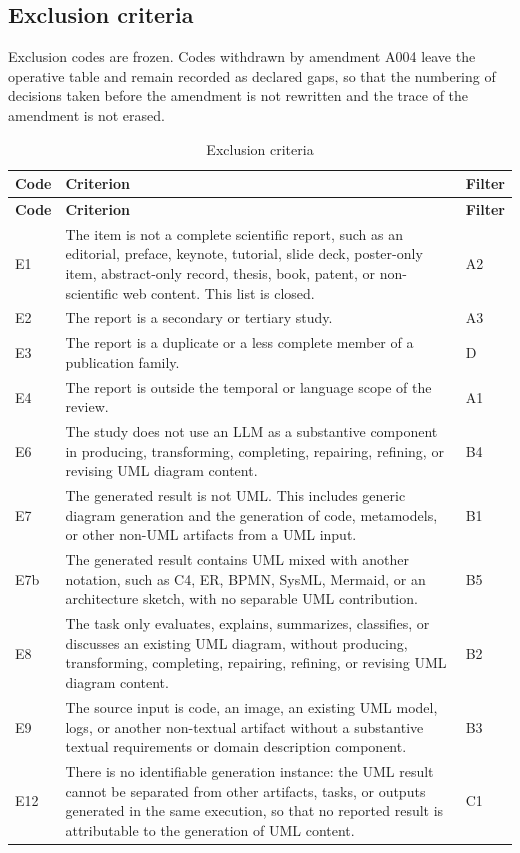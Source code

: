 \subsection{Exclusion criteria}

Exclusion codes are frozen. Codes withdrawn by amendment A004 leave the operative table and remain recorded as declared gaps, so that the numbering of decisions taken before the amendment is not rewritten and the trace of the amendment is not erased.

\begin{longtable}{p{} p{} p{}}
\caption{Exclusion criteria}
\label{tab:protocol_exclusion}\\
\toprule
\textbf{Code} & \textbf{Criterion} & \textbf{Filter} \\
\midrule
\endfirsthead
\toprule
\textbf{Code} & \textbf{Criterion} & \textbf{Filter} \\
\midrule
\endhead
E1 & The item is not a complete scientific report, such as an editorial, preface, keynote, tutorial, slide deck, poster-only item, abstract-only record, thesis, book, patent, or non-scientific web content. This list is closed. & A2 \\
E2 & The report is a secondary or tertiary study. & A3 \\
E3 & The report is a duplicate or a less complete member of a publication family. & D \\
E4 & The report is outside the temporal or language scope of the review. & A1 \\
E6 & The study does not use an LLM as a substantive component in producing, transforming, completing, repairing, refining, or revising UML diagram content. & B4 \\
E7 & The generated result is not UML. This includes generic diagram generation and the generation of code, metamodels, or other non-UML artifacts from a UML input. & B1 \\
E7b & The generated result contains UML mixed with another notation, such as C4, ER, BPMN, SysML, Mermaid, or an architecture sketch, with no separable UML contribution. & B5 \\
E8 & The task only evaluates, explains, summarizes, classifies, or discusses an existing UML diagram, without producing, transforming, completing, repairing, refining, or revising UML diagram content. & B2 \\
E9 & The source input is code, an image, an existing UML model, logs, or another non-textual artifact without a substantive textual requirements or domain description component. & B3 \\
E12 & There is no identifiable generation instance: the UML result cannot be separated from other artifacts, tasks, or outputs generated in the same execution, so that no reported result is attributable to the generation of UML content. & C1 \\
\bottomrule
\end{longtable}

